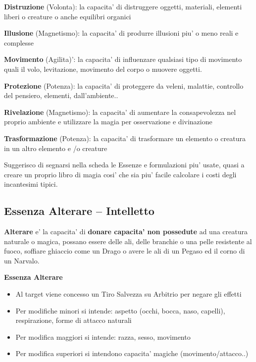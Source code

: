 \documentclass[a4paper,11pt,twoside,openany]{book}
\begin{document}
	\textbf{Distruzione} (Volonta): la capacita' di distruggere oggetti, materiali, elementi liberi o creature o anche equilibri organici
	
	\textbf{Illusione} (Magnetismo): la capacita' di produrre illusioni piu' o meno reali e complesse
	
	\textbf{Movimento} (Agilita)': la capacita' di influenzare qualsiasi tipo di movimento quali il volo, levitazione, movimento del corpo o muovere oggetti.
	
	\textbf{Protezione} (Potenza): la capacita' di proteggere da veleni, malattie, controllo del pensiero, elementi, dall'ambiente..
	
	\textbf{Rivelazione} (Magnetismo): la capacita' di aumentare la consapevolezza nel proprio ambiente e utilizzare la magia per osservazione e divinazione
	
	\textbf{Trasformazione} (Potenza): la capacita' di trasformare un elemento o creatura in un altro elemento e /o creature
	
	\bigskip
	
	Suggerisco di segnarsi nella scheda le Essenze e formulazioni piu' usate, quasi a creare un proprio libro di magia cosi' che sia piu' facile calcolare i costi degli incantesimi tipici.
	
	\pagebreak
	
	\subsection{Essenza Alterare -- Intelletto}
	
	\label{essenza-alterare---intelletto}
	
	\textbf{Alterare} e' la capacita' di \textbf{donare capacita' non possedute} ad una creatura naturale o magica, possano essere delle ali, delle branchie o una pelle resistente al fuoco, soffiare ghiaccio come un Drago o avere le ali di un Pegaso ed il corno di un Narvalo.
	
	\bigskip
	
	\textbf{Essenza Alterare}
	\begin{itemize}
		\item 
		Al target viene concesso un Tiro Salvezza su Arbitrio per negare gli effetti 
		\item 
		Per modifiche minori si intende: aspetto (occhi, bocca, naso, capelli), respirazione, forme di attacco naturali 
		\item 
		Per modifica maggiori si intende: razza, sesso, movimento 
		\item 
		Per modifica superiori si intendono capacita' magiche (movimento/attacco..) 
	\end{itemize}
	
\end{document}
